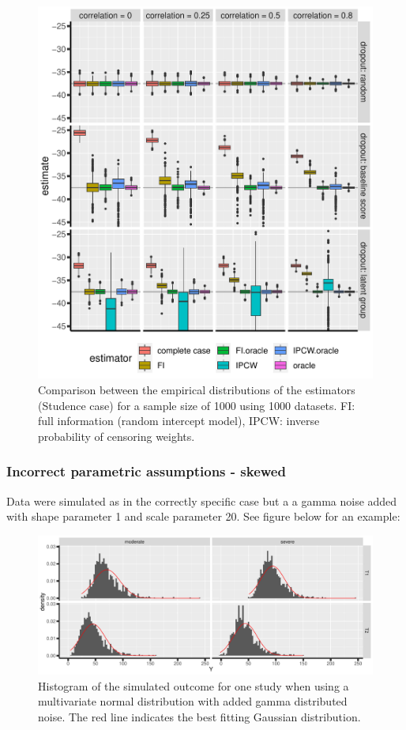 \documentclass[12pt]{article}
\begin{document}
\begin{figure}[!h]
\centering
\includegraphics[width=\textwidth]{./figures/simStudy-bias-t3.pdf}
\caption{\label{fig:simulationGaussian}Comparison between the empirical distributions of the estimators (Studence case) for a sample size of 1000 using 1000 datasets. FI: full information (random intercept model), IPCW: inverse probability of censoring weights.}
\end{figure}

\clearpage

\subsubsection{Incorrect parametric assumptions - skewed}
\label{sec:orgaba7b8b}


Data were simulated as in the correctly specific case but a a gamma
noise added with shape parameter 1 and scale parameter 20. See
figure below for an example:
\begin{figure}[!h]
\centering
\includegraphics[trim={0 0 0 0},width=1\textwidth]{./figures/simStudy-gamma-hist.pdf}
\caption{\label{fig:student-hist}Histogram of the simulated outcome for one study when using a multivariate normal distribution with added gamma distributed noise. The red line indicates the best fitting Gaussian distribution.}
\end{figure}
\end{document}
